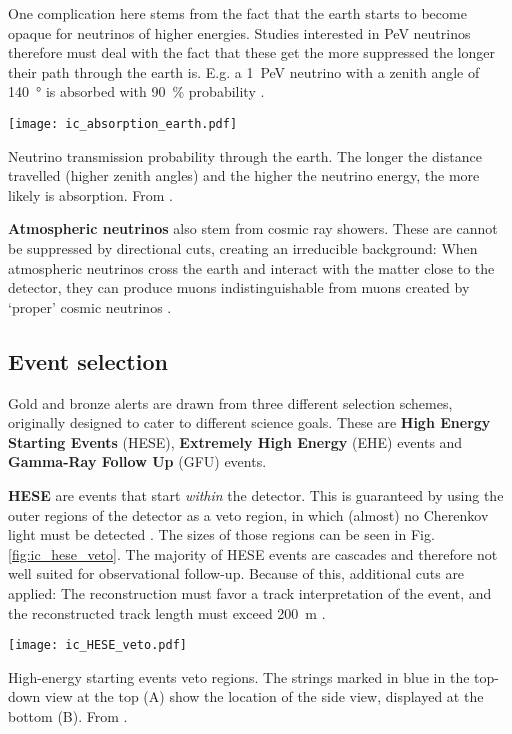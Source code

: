 One complication here stems from the fact that the earth starts to become opaque for neutrinos of higher energies. Studies interested in \si{\peta\eV} neutrinos therefore must deal with the fact that these get the more suppressed the longer their path through the earth is. E.g. a \SI{1}{\peta\eV} neutrino with a zenith angle of \SI{140}{\degree} is absorbed with \SI{90}{\percent} probability .

\begin{marginfigure}
    \texttt{[image: ic\_absorption\_earth.pdf]}
    \caption[Neutrino absorption in the earth]{Neutrino transmission probability through the earth. The longer the distance travelled (higher zenith angles) and the higher the neutrino energy, the more likely is absorption. From \cite{Aartsen2017c}.}
\end{marginfigure}

\textbf{Atmospheric neutrinos} also stem from cosmic ray showers. These are cannot be suppressed by directional cuts, creating an irreducible background: When atmospheric neutrinos cross the earth and interact with the matter close to the detector, they can produce muons indistinguishable from muons created by `proper' cosmic neutrinos \cite{Ahlers2018a}.

\subsection{Event selection} \label{ic_event_selection}
Gold and bronze alerts are drawn from three different selection schemes, originally designed to cater to different science goals. These are \textbf{High Energy Starting Events} (HESE), \textbf{Extremely High Energy} (EHE) events and \textbf{Gamma-Ray Follow Up} (GFU) events.

\textbf{HESE} are events that start \textit{within} the detector. This is guaranteed by using the outer regions of the detector as a veto region, in which (almost) no Cherenkov light must be detected . The sizes of those regions can be seen in Fig. \ref{fig:ic_hese_veto}. The majority of HESE events are cascades and therefore not well suited for observational follow-up. Because of this, additional cuts are applied: The reconstruction must favor a track interpretation of the event, and the reconstructed track length must exceed \SI{200}{\meter} \cite{Tung2019}.
\begin{marginfigure}
    \texttt{[image: ic\_HESE\_veto.pdf]}
    \caption[HESE veto regions]{High-energy starting events veto regions. The strings marked in blue in the top-down view at the top (A) show the location of the side view, displayed at the bottom (B). From \cite{Aartsen2013}.}
\end{marginfigure}


